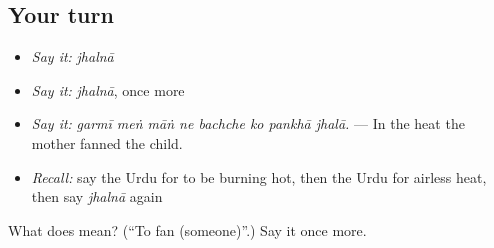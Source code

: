 \subsection*{Your turn}
\begin{itemize}
\raggedright
  \item \emph{Say it:} \emph{jhalnā}
  \item \emph{Say it:} \emph{jhalnā}, once more
  \item \emph{Say it:} \emph{garmī meṅ māṅ ne bachche ko pankhā jhalā.} — In the heat the mother fanned the child.
  \item \emph{Recall:} say the Urdu for to be burning hot, then the Urdu for airless heat, then say \emph{jhalnā} again
\end{itemize}

\begin{tcolorbox}[breakable,colback=teal!4,colframe=teal!35!black,title={Before you move on}]
What does  mean? (\textquotedblleft{}To fan (someone)\textquotedblright{}.) Say it once more.
\end{tcolorbox}
